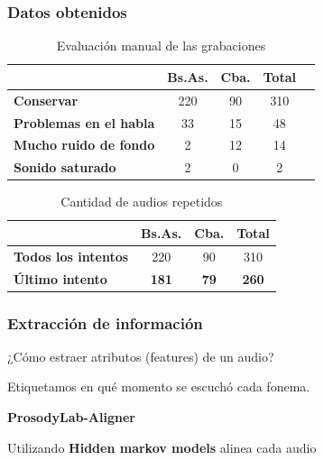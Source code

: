 \documentclass[mathserif]{beamer}%
\begin{document}
\begin{frame}
	\frametitle{Datos obtenidos}
	
	\begin{table}[h]
		\centering
		\begin{tabular}{|l|c|c|c|c|}
			\hline
			\textbf{}  & \textbf{Bs.As. } & \textbf{Cba.} & \textbf{Total} \\ \hline
			\textbf{Conservar}  & 220 & 90 & 310 \\ \hline
			\textbf{Problemas en el habla}  & 33 & 15 & 48 \\ \hline
			\textbf{Mucho ruido de fondo}  & 2 & 12 & 14 \\ \hline
			\textbf{Sonido saturado}  & 2 & 0 & 2 \\ \hline
		\end{tabular}
		\caption{Evaluación manual de las grabaciones}
		\label{eva_table}
	\end{table}
	
	\begin{table}[H]
		\centering
		\begin{tabular}{|l|c|c|c|}
			\hline
			\textbf{}  & \textbf{Bs.As. } & \textbf{Cba.} & \textbf{Total} \\ \hline
			\textbf{Todos los intentos}  & 220 & 90 & 310 \\ \hline
			\cellcolor{blue!25}\textbf{Último intento}  & \cellcolor{blue!25}\textbf{181} & \cellcolor{blue!25}\textbf{79} & \cellcolor{blue!25}\textbf{260} \\ \hline
		\end{tabular}
		\caption{Cantidad de audios repetidos}
		\label{eva_table_rep}
	\end{table}
\end{frame}

\begin{frame}
	\frametitle{Extracción de información}
	
	¿Cómo estraer atributos (features) de un audio?
	
	Etiquetamos en qué momento se escuchó cada fonema.
	
	\begin{center}
			\textbf{ProsodyLab-Aligner}
	\end{center}
	
	Utilizando \textbf{Hidden markov models} alinea cada audio
	
\end{frame}
\end{document}

